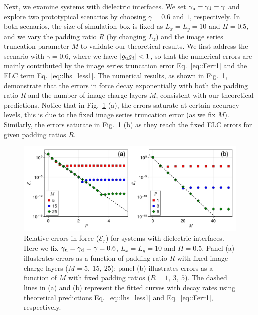 Next, we examine systems with dielectric interfaces.
We set $\gamma_{\text{u}}=\gamma_{\text{d}}=\gamma$ and explore two prototypical scenarios by choosing $\gamma = 0.6$ and $1$, respectively. 
In both scenarios, the size of simulation box is fixed as $L_x=L_y=10$ and $H = 0.5$, and we vary the padding ratio $R$ (by changing $L_z$) and the image series truncation parameter $M$ to validate our theoretical results.
We first address the scenario with $\gamma = 0.6$, where we have $|g_{\text{u}}g_{\text{d}}| < 1$, so that the numerical errors are mainly contributed by the image series truncation error Eq.~\eqref{eq::Ferr1} and the ELC term Eq.~\eqref{eq::lhs_less1}.
The numerical results, as shown in Fig.~\ref{fig:error_icm_pad_gamma_0.6_force}, demonstrate that the errors in force decay exponentially with both the padding ratio $R$ and the number of image charge layers $M$, consistent with our theoretical predictions. Notice that in Fig.~\ref{fig:error_icm_pad_gamma_0.6_force} (a), the errors saturate at certain accuracy levels, this is due to the fixed image series truncation error (as we fix $M$). Similarly, the errors saturate in Fig.~\ref{fig:error_icm_pad_gamma_0.6_force} (b) as they reach the fixed ELC errors for given padding ratios $R$.
\begin{figure}[htbp]
    \centering
    \includegraphics[width=0.98\linewidth]{figs/error_icm_pad_gamma_0.6_force.pdf}
    \caption{Relative errors in force ($\mathcal{E}_r$) for systems with dielectric interfaces. Here we fix $\gamma_{\text{u}}=\gamma_{\text{d}}=\gamma = 0.6$, $L_x=L_y=10$ and $H = 0.5$. 
    Panel (a) illustrates errors as a function of padding ratio $R$ with fixed image charge layers ($M=5,~15,~25$); panel (b) illustrates errors as a function of $M$ with fixed padding ratios ($R = 1,~3,~5$). The dashed lines in (a) and (b) represent the fitted curves with decay rates using theoretical predictions Eq.~\eqref{eq::lhs_less1} and Eq.~\eqref{eq::Ferr1}, respectively.}
    \label{fig:error_icm_pad_gamma_0.6_force}
\end{figure}

